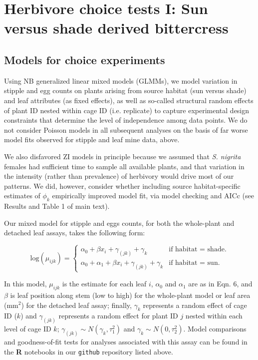 \documentclass[11pt, oneside]{amsart}
\newcommand{\lib}[1]{\texttt{#1}}
\begin{document}
\section{Herbivore choice tests I: Sun versus shade derived bittercress}

\subsection{Models for choice experiments}
Using NB generalized linear mixed models (GLMMs), we model variation in stipple and egg counts on plants arising from source habitat (sun versus shade) and leaf attributes (as fixed effects), as well as so-called structural random effects of plant ID nested within cage ID (i.e. replicate) to capture experimental design constraints that determine the level of independence among data points. We do not consider Poisson models in all subsequent analyses on the basis of far worse model fits observed for stipple and leaf mine data, above.

We also disfavored ZI models in principle because we assumed that \emph{S. nigrita} females had sufficient time to sample all available plants, and that variation in the intensity (rather than prevalence) of herbivory would drive most of our patterns. We did, however, consider whether including source habitat-specific estimates of $\phi_{k}$ empirically improved model fit, via model checking and AICc (see Results and Table 1 of main text).

Our mixed model for stipple and eggs counts, for both the whole-plant and detached leaf assays, takes the following form:

\begin{equation}
\text{log}(\mu_{ijk}) = \begin{cases}
	\alpha_0 + \beta x_i + \gamma_{(jk)} + \gamma_k & \text{if habitat = shade}.\\
    \alpha_0 + \alpha_1 + \beta x_i + \gamma_{(jk)} + \gamma_k & \text{if habitat = sun}.
  \end{cases}
\end{equation}

In this model, $\mu_{ijk}$ is the estimate for each leaf $i$, $\alpha_0$ and $\alpha_1$ are as in Eqn. 6, and $\beta$ is leaf position along stem (low to high) for the whole-plant model or leaf area (mm$^2$) for the detached leaf assay; finally, $\gamma_{k}$ represents a random effect of cage ID ($k$) and $\gamma_{(jk)}$ represents a random effect for plant ID $j$ nested within each level of cage ID $k$; $\gamma_{(jk)} \sim N(\gamma_{k},\tau^2_1)$ and $\gamma_{k} \sim N(0,\tau^2_2)$. Model comparisons and goodness-of-fit tests for analyses associated with this assay can be found in the \textbf{R} notebooks in our \lib{github} repository listed above.
\end{document}

